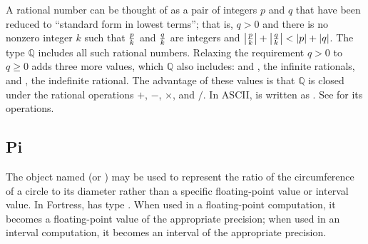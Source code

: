 A rational number can be thought of as a pair of integers $p$ and $q$
that have been reduced to ``standard form in lowest terms'';
that is, $q > 0$ and there is no nonzero integer $k$
such that $p \over k$ and $q \over k$ are integers
and $\left| {p \over k} \right| + \left| {q \over k} \right|
	< \left| p \right| + \left| q \right|$.
The type $\mathbb{Q}$ includes all such rational numbers.
Relaxing the requirement $q>0$ to $q \geq 0$ adds three more values, which
$\mathbb{Q}$ also includes:  and , the infinite rationals,
and , the indefinite rational.
The advantage of these values is that $\mathbb{Q}$ is closed under the rational
operations $+$, $-$, $\times$, and $/$.
In ASCII,  is written as .
See  for its operations.



\subsection{Pi}

The object named \EXP{\pi} (or ) may be used to represent the ratio
of the circumference of a circle to its diameter rather than a specific
floating-point value or interval value.
In Fortress, \EXP{\pi} has type
.
When used in a floating-point computation, it becomes
a floating-point value of the appropriate precision; when used in an interval
computation, it becomes an interval of the appropriate precision.

